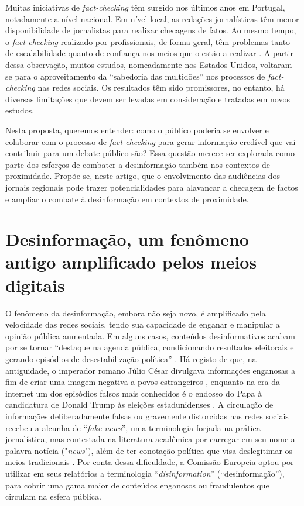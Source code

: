 \documentclass[portuguese]{textolivre}
\begin{document}
Muitas iniciativas de \emph{fact-checking} têm surgido nos últimos anos em Portugal, notadamente a nível nacional. Em nível local, as redações jornalísticas têm menor disponibilidade de jornalistas para realizar checagens de fatos. Ao mesmo tempo, o \emph{fact-checking} realizado por profissionais, de forma geral, têm problemas tanto de escalabilidade quanto de confiança nos meios que o estão a realizar \cite{allen_scaling_2021}. A partir dessa observação, muitos estudos, nomeadamente nos Estados Unidos, voltaram-se para o aproveitamento da “sabedoria das multidões” \cite{surowiecki_wisdom_2005} nos processos de \emph{fact-checking} nas redes sociais. Os resultados têm sido promissores, no entanto, há diversas limitações que devem ser levadas em consideração e tratadas em novos estudos.

Nesta proposta, queremos entender: como o público poderia se envolver e colaborar com o processo de \emph{fact-checking} para gerar informação credível que vai contribuir para um debate público são? Essa questão merece ser explorada como parte dos esforços de combater a desinformação também nos contextos de proximidade. Propõe-se, neste artigo, que o envolvimento das audiências dos jornais regionais pode trazer potencialidades para alavancar a checagem de factos e ampliar o combate à desinformação em contextos de proximidade.


\section{Desinformação, um fenômeno antigo amplificado pelos meios digitais}
O fenômeno da desinformação, embora não seja novo, é amplificado pela velocidade das redes sociais, tendo sua capacidade de enganar e manipular a opinião pública aumentada. Em alguns casos, conteúdos desinformativos acabam por se tornar “destaque na agenda pública, condicionando resultados eleitorais e gerando episódios de desestabilização política” \cite[p.1]{jeronimoespartaza022}. Há registo de que, na antiguidade, o imperador romano Júlio César divulgava informações enganosas a fim de criar uma imagem negativa a povos estrangeiros \cite{kapferer1993boatos}, enquanto na era da internet um dos episódios falsos mais conhecidos é o endosso do Papa à candidatura de Donald Trump às eleições estadunidenses \cite{baptista_understanding_2020}. A circulação de informações deliberadamente falsas ou gravemente distorcidas nas redes sociais recebeu a alcunha de “\emph{fake news}”, uma terminologia forjada na prática jornalística, mas contestada na literatura acadêmica por carregar em seu nome a palavra notícia ("\emph{news}"), além de ter conotação política que visa deslegitimar os meios tradicionais \cite{rieder2018examinando, baptista_elections_2022}. Por conta dessa dificuldade, a Comissão Europeia optou por utilizar em seus relatórios a terminologia “\emph{disinformation}” (“desinformação”), para cobrir uma gama maior de conteúdos enganosos ou fraudulentos que circulam na esfera pública.
\end{document}
